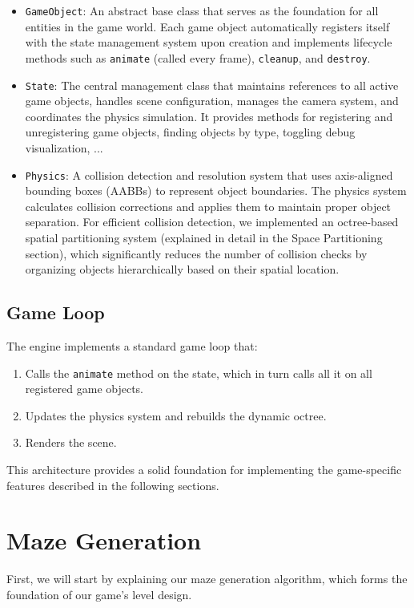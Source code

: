 \documentclass{article}
\begin{document}
\begin{itemize}
    \item \texttt{GameObject}: An abstract base class that serves as the foundation for all entities in the game world. Each game object automatically registers itself with the state management system upon creation and implements lifecycle methods such as \texttt{animate} (called every frame), \texttt{cleanup}, and \texttt{destroy}.

    \item \texttt{State}: The central management class that maintains references to all active game objects, handles scene configuration, manages the camera system, and coordinates the physics simulation. It provides methods for registering and unregistering game objects, finding objects by type, toggling debug visualization, ...

    \item \texttt{Physics}: A collision detection and resolution system that uses axis-aligned bounding boxes (AABBs) to represent object boundaries. The physics system calculates collision corrections and applies them to maintain proper object separation. For efficient collision detection, we implemented an octree-based spatial partitioning system (explained in detail in the Space Partitioning section), which significantly reduces the number of collision checks by organizing objects hierarchically based on their spatial location.
\end{itemize}

\subsection{Game Loop}
The engine implements a standard game loop that:

\begin{enumerate}
    \item Calls the \texttt{animate} method on the state, which in turn calls all it on all registered game objects.
    \item Updates the physics system and rebuilds the dynamic octree.
    \item Renders the scene.
\end{enumerate}

This architecture provides a solid foundation for implementing the game-specific features described in the following sections.

\section{Maze Generation}
First, we will start by explaining our maze generation algorithm, which forms the foundation of our game's level design.
\end{document}
